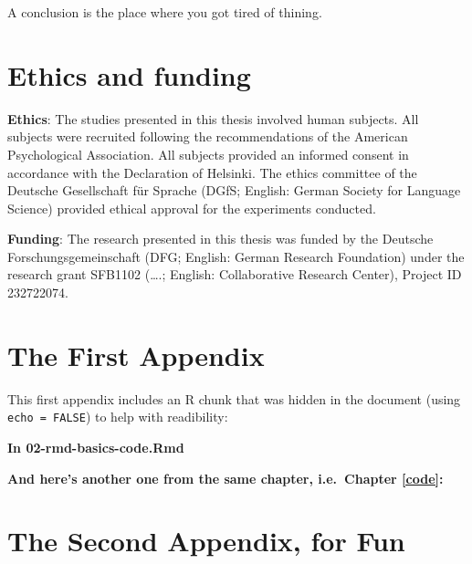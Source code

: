\documentclass[a4paper, nobind]{templates/ociamthesis}
\newcommand*{\bibtitle}{Bibliography}
\begin{document}
\minitoc 

\begin{savequote}
A conclusion is the place where you got tired of thining.
\end{savequote}



\hypertarget{ethics-and-funding}{%
\chapter{Ethics and funding}\label{ethics-and-funding}}

\noindent 

\textbf{Ethics}: The studies presented in this thesis involved human subjects.
All subjects were recruited following the recommendations of the American Psychological Association.
All subjects provided an informed consent in accordance with the Declaration of Helsinki.
The ethics committee of the Deutsche Gesellschaft für Sprache (DGfS; English: German Society for Language Science) provided ethical approval for the experiments conducted.

\textbf{Funding}: The research presented in this thesis was funded by the Deutsche Forschungsgemeinschaft (DFG; English: German Research Foundation) under the research grant SFB1102 (\ldots.; English: Collaborative Research Center), Project ID 232722074.

\minitoc 

\startappendices

\hypertarget{the-first-appendix}{%
\chapter{The First Appendix}\label{the-first-appendix}}

This first appendix includes an R chunk that was hidden in the document (using \texttt{echo\ =\ FALSE}) to help with readibility:

\textbf{In 02-rmd-basics-code.Rmd}

\textbf{And here's another one from the same chapter, i.e.~Chapter \ref{code}:}

\hypertarget{the-second-appendix-for-fun}{%
\chapter{The Second Appendix, for Fun}\label{the-second-appendix-for-fun}}


\setlength{\baselineskip}{0pt} %

{\renewcommand*\MakeUppercase[1]{#1}%
\printbibliography[heading=bibintoc,title={\bibtitle}]}
\end{document}
